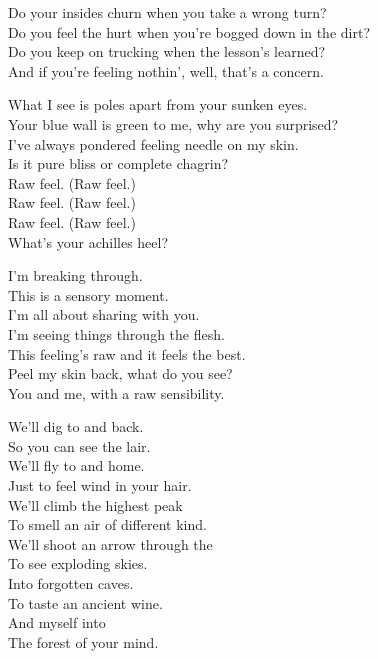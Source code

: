 
Do your insides churn when you take a wrong turn? \\
Do you feel the hurt when you're bogged down in the dirt? \\
Do you keep on trucking when the lesson's learned? \\
And if you're feeling nothin', well, that's a concern. \\


What I see is poles apart from your sunken eyes. \\
Your blue wall is green to me, why are you surprised? \\
I've always pondered feeling needle on my skin. \\
Is it pure bliss or complete chagrin? \\

Raw feel. (Raw feel.) \\
Raw feel. (Raw feel.) \\
Raw feel. (Raw feel.) \\
What's your achilles heel? \\


I'm breaking through. \\
This is a sensory moment. \\
I'm all about sharing with you. \\
I'm seeing things through the flesh. \\
This feeling's raw and it feels the best. \\
Peel my skin back, what do you see? \\
You and me, with a raw sensibility. \\


We'll dig to  and back. \\
So you can see the  lair. \\
We'll fly to  and home. \\
Just to feel wind in your hair. \\

We'll climb the highest peak \\
To smell an air of different kind. \\
We'll shoot an arrow through the  \\
To see exploding skies. \\
Into forgotten caves. \\
To taste an ancient wine. \\
And  myself into \\
The forest of your mind. \\

